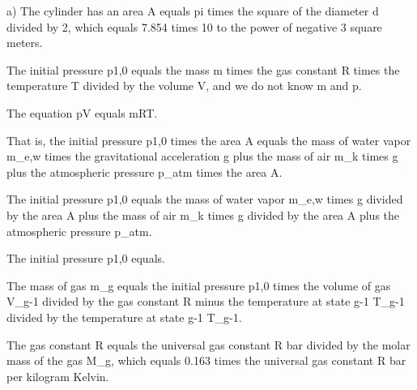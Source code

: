 a) The cylinder has an area A equals pi times the square of the diameter d divided by 2, which equals 7.854 times 10 to the power of negative 3 square meters.

The initial pressure p1,0 equals the mass m times the gas constant R times the temperature T divided by the volume V, and we do not know m and p.

The equation pV equals mRT.

That is, the initial pressure p1,0 times the area A equals the mass of water vapor m_e,w times the gravitational acceleration g plus the mass of air m_k times g plus the atmospheric pressure p_atm times the area A.

The initial pressure p1,0 equals the mass of water vapor m_e,w times g divided by the area A plus the mass of air m_k times g divided by the area A plus the atmospheric pressure p_atm.

The initial pressure p1,0 equals.

The mass of gas m_g equals the initial pressure p1,0 times the volume of gas V_g-1 divided by the gas constant R minus the temperature at state g-1 T_g-1 divided by the temperature at state g-1 T_g-1.

The gas constant R equals the universal gas constant R bar divided by the molar mass of the gas M_g, which equals 0.163 times the universal gas constant R bar per kilogram Kelvin.